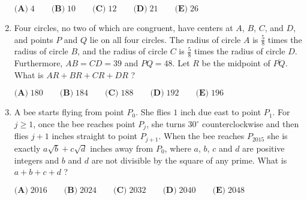 \documentclass{article}
\begin{document}
\begin{enumerate}[label=\arabic*., itemsep=0.5em]
$\textbf{(A)}\; 4 \qquad\textbf{(B)}\; 10 \qquad\textbf{(C)}\; 12 \qquad\textbf{(D)}\; 21 \qquad\textbf{(E)}\; 26$\par \vspace{0.5em}\item Four circles, no two of which are congruent, have centers at $A$, $B$, $C$, and $D$, and points $P$ and $Q$ lie on all four circles. The radius of circle $A$ is $\tfrac{5}{8}$ times the radius of circle $B$, and the radius of circle $C$ is $\tfrac{5}{8}$ times the radius of circle $D$. Furthermore, $AB = CD = 39$ and $PQ = 48$. Let $R$ be the midpoint of $\overline{PQ}$. What is $AR+BR+CR+DR$ ?

$\textbf{(A)}\; 180 \qquad\textbf{(B)}\; 184 \qquad\textbf{(C)}\; 188 \qquad\textbf{(D)}\; 192\qquad\textbf{(E)}\; 196$\par \vspace{0.5em}\item A bee starts flying from point $P_0$. She flies $1$ inch due east to point $P_1$. For $j \ge 1$, once the bee reaches point $P_j$, she turns $30^{\circ}$ counterclockwise and then flies $j+1$ inches straight to point $P_{j+1}$. When the bee reaches $P_{2015}$ she is exactly $a \sqrt{b} + c \sqrt{d}$ inches away from $P_0$, where $a$, $b$, $c$ and $d$ are positive integers and $b$ and $d$ are not divisible by the square of any prime. What is $a+b+c+d$ ?

$\textbf{(A)}\; 2016 \qquad\textbf{(B)}\; 2024 \qquad\textbf{(C)}\; 2032 \qquad\textbf{(D)}\; 2040 \qquad\textbf{(E)}\; 2048$\par \vspace{0.5em}\end{enumerate}
\end{document}
